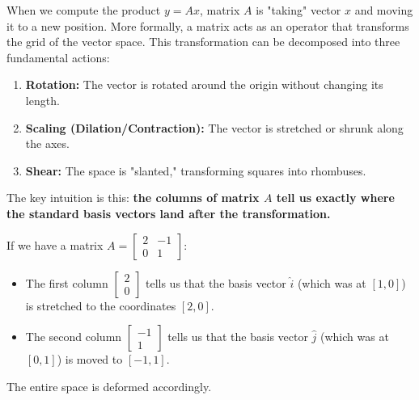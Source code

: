 \documentclass[12pt,a4paper,twoside,openright]{book}
\begin{document}
When we compute the product $y = Ax$, matrix $A$ is "taking" vector $x$ and moving it to a new position. More formally, a matrix acts as an operator that transforms the grid of the vector space. This transformation can be decomposed into three fundamental actions:

\begin{enumerate}
    \item \textbf{Rotation:} The vector is rotated around the origin without changing its length.
    \item \textbf{Scaling (Dilation/Contraction):} The vector is stretched or shrunk along the axes.
    \item \textbf{Shear:} The space is "slanted," transforming squares into rhombuses.
\end{enumerate}

The key intuition is this: \textbf{the columns of matrix $A$ tell us exactly where the standard basis vectors land after the transformation.}

If we have a matrix $A = \begin{bmatrix} 2 & -1 \\ 0 & 1 \end{bmatrix}$:
\begin{itemize}
    \item The first column $\begin{bmatrix} 2 \\ 0 \end{bmatrix}$ tells us that the basis vector $\hat{i}$ (which was at $[1, 0]$) is stretched to the coordinates $[2, 0]$.
    \item The second column $\begin{bmatrix} -1 \\ 1 \end{bmatrix}$ tells us that the basis vector $\hat{j}$ (which was at $[0, 1]$) is moved to $[-1, 1]$.
\end{itemize}

The entire space is deformed accordingly.
\end{document}

